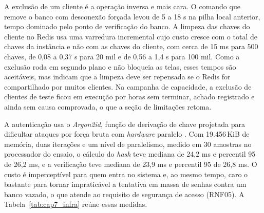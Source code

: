 \par A exclusão de um cliente é a operação inversa e mais cara. O comando que remove o banco com desconexão forçada levou de 5 a 18 s na pilha local anterior, tempo dominado pelo ponto de verificação do banco. A limpeza das chaves do cliente no Redis usa uma varredura incremental cujo custo cresce com o total de chaves da instância e não com as chaves do cliente, com cerca de 15 ms para 500 chaves, de 0,08 a 0,37 s para 20 mil e de 0,56 a 1,4 s para 100 mil. Como a exclusão roda em segundo plano e não bloqueia as telas, esses tempos são aceitáveis, mas indicam que a limpeza deve ser repensada se o Redis for compartilhado por muitos clientes. Na campanha de capacidade, a exclusão de clientes de teste ficou em execução por horas sem terminar, achado registrado e ainda sem causa comprovada, o que a seção de limitações retoma.


\par A autenticação usa o \emph{Argon2id}, função de derivação de chave projetada para dificultar ataques por força bruta com \emph{hardware} paralelo \cite{ARGON2_RFC9106}. Com 19.456\,KiB de memória, duas iterações e um nível de paralelismo, medido em 30 amostras no processador do ensaio, o cálculo do \emph{hash} teve mediana de 24,2 ms e percentil 95 de 26,2 ms, e a verificação teve mediana de 23,9 ms e percentil 95 de 26,8 ms. O custo é imperceptível para quem entra no sistema e, ao mesmo tempo, caro o bastante para tornar impraticável a tentativa em massa de senhas contra um banco vazado, o que atende ao requisito de segurança de acesso (RNF05). A Tabela~\ref{tab:cap7_infra} reúne essas medidas.

